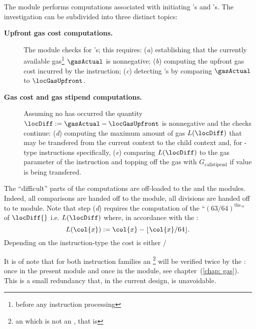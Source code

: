 The \stpMod{} module performs computations associated with initiating 's and 's. The investigation can be subdivided into three distinct topics:
\begin{description}
	\item[\colorbox{solarized-orange}{\textbf{Upfront gas cost computations.}}]
		The module checks for \oogxSH{}'s; this requires:
		(\emph{a}) establishing that the currently available gas\footnote{before any instruction processing} $\gasActual$ is nonnegative;
		(\emph{b}) computing the upfront gas cost \locGasUpfront{} incurred by the instruction;
		(\emph{c}) detecting \oogxSH{}'s by comparing $\gasActual$ to $\locGasUpfront$.
	\item[\colorbox{solarized-green}{\textbf{Gas cost and gas stipend computations.}}]
		Assuming no \oogxSH{} has occurred the quantity $\locDiff := \gasActual - \locGasUpfront$ is nonnegative and the checks continue:
		(\emph{d})
		computing the maximum amount of gas $L(\locDiff)$ that may be transfered from the current context to the child context and,
		for -type instructions specifically,
		(\emph{e})  comparing $L(\locDiff)$ to the gas parameter of the instruction and topping off the gas with $G_\text{callstipend}$ if value is being transfered.
\end{description}
The ``difficult'' parts of the computations are off-loaded to the \wcpMod{} and the \modMod{} modules. Indeed, all comparisons are handed off to the \wcpMod{} module, all divisions are handed off to te \modMod{} module. Note that step (\emph{d}) requires the computation of the ``$(63/64)^{\text{ths}}$'' of $\locDiff{}$ i.e. $L(\locDiff)$ where, in accordance with the \cite{EYP-London}:
\[ L(\col{x}) := \col{x} - \lfloor \col{x}/64 \rfloor . \]
\saNote{} Depending on the instruction-type the \locGasUpfront{} cost is either \locGasUpfrontCall{} / \locGasUpfrontCreate{}

\saNote{} It is of note that for both instruction families an \oogxSH{}\footnote{an \oogxSH{} which is not an \mxpxSH{}, that is} will be verified twice by the \zkEvm{}:
once in the present \stpMod{} module and
once in the \gasMod{} module, see chapter~(\ref{chap: gas}).
This is a small redundancy that, in the current design, is unavoidable.
